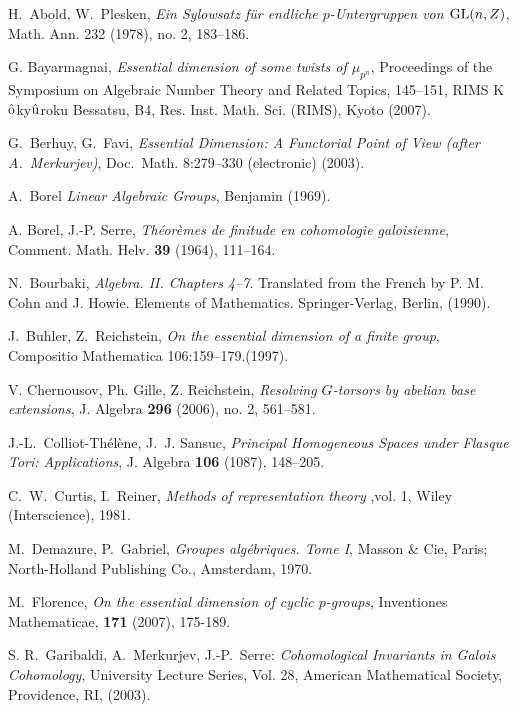 \documentclass[11pt]{amsart}
\theoremstyle{definition}
\theoremstyle{remark}
\begin{document}
\begin{thebibliography}{99}

H.~Abold, W.~Plesken, {\em Ein Sylowsatz f\"ur endliche $p$-Untergruppen 
von ${\rm GL}(n,Z)$}, Math. Ann.  232  (1978), no. 2, 183--186.

 G. Bayarmagnai, {\em
Essential dimension of some twists of $\mu_{p^n}$},
Proceedings of the Symposium on Algebraic Number Theory
and Related Topics,  145--151,
RIMS K$\hat{\rm o}$ky$\hat{\rm u}$roku Bessatsu,
B4, Res. Inst. Math. Sci. (RIMS), Kyoto (2007).

G.~Berhuy, G.~Favi, {\em Essential Dimension: A Functorial Point of View (after A.~Merkurjev)}, Doc.~Math. 8:279--330 (electronic) (2003).

A.~Borel {\em Linear Algebraic Groups}, Benjamin (1969).

A. Borel, J.-P. Serre, {\em Th\'eor\`emes de finitude 
en cohomologie galoisienne}, Comment. Math. Helv. {\bf 39} (1964), 
111--164.

N.~Bourbaki, {\em Algebra. II. Chapters 4--7}.
Translated from the French by P. M. Cohn and J. Howie.
Elements of Mathematics. Springer-Verlag, Berlin,  (1990).

J.~Buhler, Z.~Reichstein, {\em On the essential dimension of a finite group}, Compositio Mathematica 106:159--179.(1997).

V. Chernousov, Ph. Gille, Z. Reichstein, {\em Resolving 
$G$-torsors by abelian base extensions},  J. Algebra  {\bf 296} (2006),  
no. 2, 561--581.

J.-L.~Colliot-Th\'{e}l\`{e}ne, J.~J. Sansuc, {\em Principal
Homogeneous Spaces under Flasque Tori: Applications}, 
J. Algebra {\bf 106} (1087), 148--205.

 C.~W.~Curtis, I.~Reiner, {\em Methods
of representation theory} ,vol. 1, Wiley (Interscience), 1981.

 M.~Demazure, P.~Gabriel, {\em Groupes alg\'ebriques. 
Tome I}, Masson \& Cie, Paris; North-Holland Publishing Co., Amsterdam, 1970.

M.~Florence, {\em On the essential dimension of cyclic $p$-groups}, Inventiones Mathematicae, {\bf 171} (2007), 175-189. 

S. R.~Garibaldi, A.~Merkurjev, J.-P.~Serre:
{\em Cohomological Invariants in Galois
Cohomology},  University Lecture Series, Vol. 28,
American Mathematical Society, Providence, RI, (2003).


\end{thebibliography}
\end{document}
